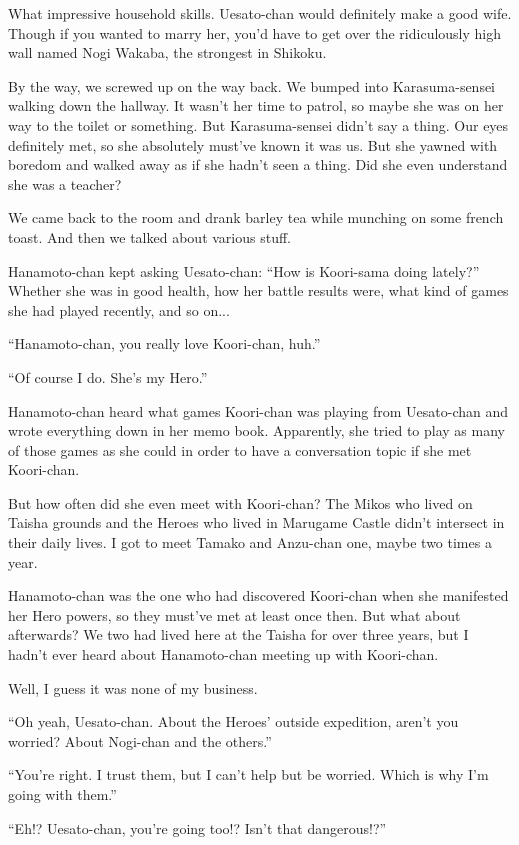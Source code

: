 What impressive household skills. Uesato-chan would definitely make a good wife. Though if you wanted to marry her, you'd have to get over the ridiculously high wall named Nogi Wakaba, the strongest in Shikoku.

By the way, we screwed up on the way back. We bumped into Karasuma-sensei walking down the hallway. It wasn't her time to patrol, so maybe she was on her way to the toilet or something. But Karasuma-sensei didn't say a thing. Our eyes definitely met, so she absolutely must've known it was us. But she yawned with boredom and walked away as if she hadn't seen a thing. Did she even understand she was a teacher?

We came back to the room and drank barley tea while munching on some french toast. And then we talked about various stuff.

Hanamoto-chan kept asking Uesato-chan: ``How is Koori-sama doing lately?'' Whether she was in good health, how her battle results were, what kind of games she had played recently, and so on...

``Hanamoto-chan, you really love Koori-chan, huh.''

``Of course I do. She's my Hero.''

Hanamoto-chan heard what games Koori-chan was playing from Uesato-chan and wrote everything down in her memo book. Apparently, she tried to play as many of those games as she could in order to have a conversation topic if she met Koori-chan.

But how often did she even meet with Koori-chan? The Mikos who lived on Taisha grounds and the Heroes who lived in Marugame Castle didn't intersect in their daily lives. I got to meet Tamako and Anzu-chan one, maybe two times a year.

Hanamoto-chan was the one who had discovered Koori-chan when she manifested her Hero powers, so they must've met at least once then. But what about afterwards? We two had lived here at the Taisha for over three years, but I hadn't ever heard about Hanamoto-chan meeting up with Koori-chan.

Well, I guess it was none of my business.

``Oh yeah, Uesato-chan. About the Heroes' outside expedition, aren't you worried? About Nogi-chan and the others.''

``You're right. I trust them, but I can't help but be worried. Which is why I'm going with them.''

``Eh!? Uesato-chan, you're going too!? Isn't that dangerous!?''

